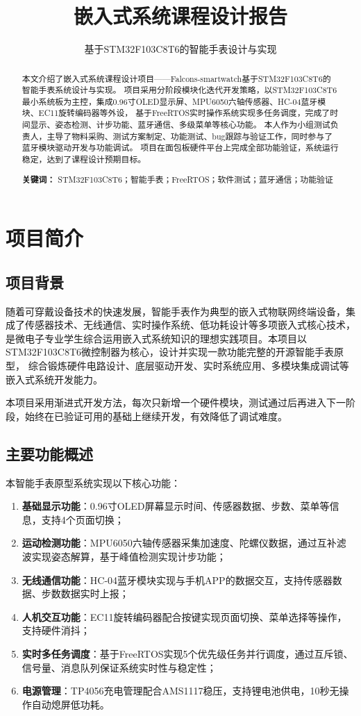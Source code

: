 \documentclass[12pt, a4paper]{ctexart}
\title{嵌入式系统课程设计报告}
\subtitle{基于STM32F103C8T6的智能手表设计与实现}
\begin{document}
\makecover

\newpage
\begin{abstract}
本文介绍了嵌入式系统课程设计项目——Falcons-smartwatch基于STM32F103C8T6的智能手表系统设计与实现。
项目采用分阶段模块化迭代开发策略，以STM32F103C8T6最小系统板为主控，集成0.96寸OLED显示屏、MPU6050六轴传感器、HC-04蓝牙模块、EC11旋转编码器等外设，
基于FreeRTOS实时操作系统实现多任务调度，完成了时间显示、姿态检测、计步功能、蓝牙通信、多级菜单等核心功能。
本人作为小组测试负责人，主导了物料采购、测试方案制定、功能测试、bug跟踪与验证工作，同时参与了蓝牙模块驱动开发与功能调试。
项目在面包板硬件平台上完成全部功能验证，系统运行稳定，达到了课程设计预期目标。
\par
\textbf{关键词：} STM32F103C8T6；智能手表；FreeRTOS；软件测试；蓝牙通信；功能验证
\end{abstract}
\clearpage

\tableofcontents
\clearpage

\setcounter{page}{1}

\section{项目简介}
\subsection{项目背景}
随着可穿戴设备技术的快速发展，智能手表作为典型的嵌入式物联网终端设备，集成了传感器技术、无线通信、实时操作系统、低功耗设计等多项嵌入式核心技术，
是微电子专业学生综合运用嵌入式系统知识的理想实践项目。本项目以STM32F103C8T6微控制器为核心，设计并实现一款功能完整的开源智能手表原型，
综合锻炼硬件电路设计、底层驱动开发、实时系统应用、多模块集成调试等嵌入式系统开发能力。

本项目采用渐进式开发方法，每次只新增一个硬件模块，测试通过后再进入下一阶段，始终在已验证可用的基础上继续开发，有效降低了调试难度。

\subsection{主要功能概述}
本智能手表原型系统实现以下核心功能：
\begin{enumerate}
    \item \textbf{基础显示功能}：0.96寸OLED屏幕显示时间、传感器数据、步数、菜单等信息，支持4个页面切换；
    \item \textbf{运动检测功能}：MPU6050六轴传感器采集加速度、陀螺仪数据，通过互补滤波实现姿态解算，基于峰值检测实现计步功能；
    \item \textbf{无线通信功能}：HC-04蓝牙模块实现与手机APP的数据交互，支持传感器数据、步数数据实时上报；
    \item \textbf{人机交互功能}：EC11旋转编码器配合按键实现页面切换、菜单选择等操作，支持硬件消抖；
    \item \textbf{实时多任务调度}：基于FreeRTOS实现5个优先级任务并行调度，通过互斥锁、信号量、消息队列保证系统实时性与稳定性；
    \item \textbf{电源管理}：TP4056充电管理配合AMS1117稳压，支持锂电池供电，10秒无操作自动熄屏低功耗。
\end{enumerate}
\end{document}
